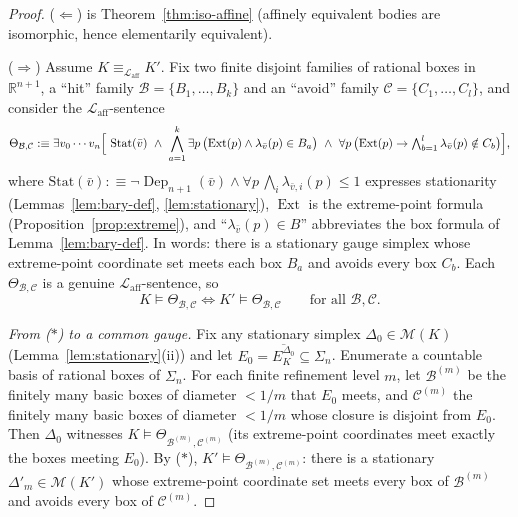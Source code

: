 \documentclass[11pt]{amsart}
\theoremstyle{definition}
\newcommand{\R}{\mathbb{R}}
\newcommand{\Laff}{\mathcal{L}_{\mathrm{aff}}}
\newcommand{\Ext}{\operatorname{Ext}}
\newcommand{\Dep}{\operatorname{Dep}}
\begin{document}
\begin{proof}
($\Leftarrow$) is Theorem~\ref{thm:iso-affine} (affinely equivalent bodies
are isomorphic, hence elementarily equivalent).

($\Rightarrow$) Assume $K\equiv_{\Laff}K'$. Fix two finite disjoint families
of rational boxes in $\R^{n+1}$, a ``hit'' family
$\mathcal B=\{B_1,\dots,B_k\}$ and an ``avoid'' family
$\mathcal C=\{C_1,\dots,C_l\}$, and consider the $\Laff$-sentence
\[
\Theta_{\mathcal B,\mathcal C}:\equiv
\exists v_0\cdots v_n\Bigl[\ \mathrm{Stat}(\bar v)\ \wedge\ 
\bigwedge_{a=1}^{k}\exists p\,\bigl(\Ext(p)\wedge\lambda_{\bar v}(p)\in B_a\bigr)
\ \wedge\ \forall p\,\bigl(\Ext(p)\to\textstyle\bigwedge_{b=1}^{l}
\lambda_{\bar v}(p)\notin C_b\bigr)\Bigr],
\]
where $\mathrm{Stat}(\bar v):\equiv\neg\Dep_{n+1}(\bar v)\wedge\forall p\,
\bigwedge_i\lambda_{\bar v,i}(p)\le1$ expresses stationarity
(Lemmas~\ref{lem:bary-def}, \ref{lem:stationary}), $\Ext$ is the
extreme-point formula (Proposition~\ref{prop:extreme}), and
``$\lambda_{\bar v}(p)\in B$'' abbreviates the box formula of
Lemma~\ref{lem:bary-def}. In words: there is a stationary gauge simplex whose
extreme-point coordinate set meets each box $B_a$ and avoids every box $C_b$.
Each $\Theta_{\mathcal B,\mathcal C}$ is a genuine $\Laff$-sentence, so
\[
K\models\Theta_{\mathcal B,\mathcal C}\iff K'\models\Theta_{\mathcal B,\mathcal C}
\qquad\text{for all }\mathcal B,\mathcal C. \tag{$\ast$}
\]

\emph{From \textup{($\ast$)} to a common gauge.} Fix any stationary simplex
$\Delta_0\in\mathcal M(K)$ (Lemma~\ref{lem:stationary}(ii)) and let
$E_0=\overline{E_K^{\Delta_0}}\subseteq\Sigma_n$. Enumerate a countable basis
of rational boxes of $\Sigma_n$. For each finite refinement level $m$, let
$\mathcal B^{(m)}$ be the finitely many basic boxes of diameter $<1/m$ that
$E_0$ meets, and $\mathcal C^{(m)}$ the finitely many basic boxes of diameter
$<1/m$ whose closure is disjoint from $E_0$. Then $\Delta_0$ witnesses
$K\models\Theta_{\mathcal B^{(m)},\mathcal C^{(m)}}$ (its extreme-point
coordinates meet exactly the boxes meeting $E_0$). By ($\ast$),
$K'\models\Theta_{\mathcal B^{(m)},\mathcal C^{(m)}}$: there is a stationary
$\Delta'_m\in\mathcal M(K')$ whose extreme-point coordinate set meets every
box of $\mathcal B^{(m)}$ and avoids every box of $\mathcal C^{(m)}$.


\end{proof}
\end{document}
